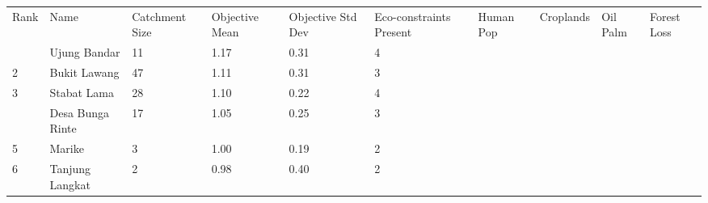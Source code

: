 \begin{table}[ht]
\centering
\begingroup\fontsize{8pt}{9pt}\selectfont
\begin{tabular}{C{0.03\textwidth}C{0.12\textwidth}C{0.09\textwidth}C{0.08\textwidth}C{0.08\textwidth}C{0.08\textwidth}C{0.07\textwidth}C{0.07\textwidth}C{0.07\textwidth}C{0.07\textwidth}}
 Rank & Name & Catchment Size & Objective Mean & Objective Std Dev & Eco-constraints  Present & Human Pop & Croplands & Oil Palm & Forest Loss \\ 
  & Ujung Bandar &  11 & \textcolor[HTML]{FFFFFF}{1.17} & \textcolor[HTML]{000000}{0.31} & \textcolor[HTML]{FFFFFF}{4} &  &  &  &  \\ 
  {2} & Bukit Lawang &  47 & \textcolor[HTML]{FFFFFF}{1.11} & \textcolor[HTML]{000000}{0.31} & \textcolor[HTML]{000000}{3} &  &  &  &  \\ 
  {3} & Stabat Lama &  28 & \textcolor[HTML]{FFFFFF}{1.10} & \textcolor[HTML]{000000}{0.22} & \textcolor[HTML]{FFFFFF}{4} &  &  &  &  \\ 
   & Desa Bunga Rinte &  17 & \textcolor[HTML]{FFFFFF}{1.05} & \textcolor[HTML]{000000}{0.25} & \textcolor[HTML]{000000}{3} &  &  &  &  \\ 
  {5} & Marike &   3 & \textcolor[HTML]{FFFFFF}{1.00} & \textcolor[HTML]{000000}{0.19} & \textcolor[HTML]{000000}{2} &  &  &  &  \\ 
  {6} & Tanjung Langkat &   2 & \textcolor[HTML]{FFFFFF}{0.98} & \textcolor[HTML]{FFFFFF}{0.40} & \textcolor[HTML]{000000}{2} &  &  &  &  \\ 

\end{tabular}
\end{table}
